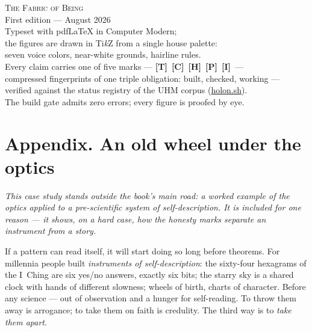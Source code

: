 \documentclass[11pt,letterpaper]{article}
\newcommand{\stT}{\textbf{[T]}\xspace}
\newcommand{\stC}{\textbf{[C]}\xspace}
\newcommand{\stP}{\textbf{[P]}\xspace}
\newcommand{\stI}{\textbf{[I]}\xspace}
\newcommand{\stH}{\textbf{[H]}\xspace}
\newcommand{\holonsh}{\href{https://holon.sh}{holon.sh}\xspace}
\newcommand{\voicerose}[4]{%
  \foreach \vang/\vcol in {90/cA,141.4/cS,192.8/cD,244.3/cL,295.7/cE,347.1/cO,38.6/cU}{%
    \draw[\vcol!55, thick] (#1,#2) -- ($(#1,#2)+(\vang:#3)$);
    \fill[\vcol] ($(#1,#2)+(\vang:#3)$) circle (#4);}}
\begin{document}
\clearpage
\thispagestyle{empty}
\vspace*{\fill}
\begin{center}\small\color{plosgray}
\begin{minipage}{0.78\textwidth}\centering
{\scshape The Fabric of Being}\\[3pt]
First edition --- August 2026\\[12pt]
Typeset with pdf\LaTeX{} in Computer Modern;\\
the figures are drawn in Ti\emph{k}Z from a single house palette:\\
seven voice colors, near-white grounds, hairline rules.\\[8pt]
Every claim carries one of five marks --- \stT\ \stC\ \stH\ \stP\ \stI\ ---\\
compressed fingerprints of one triple obligation: built, checked, working ---\\
verified against the status registry of the UHM corpus (\holonsh).\\
The build gate admits zero errors; every figure is proofed by eye.\\[14pt]
\end{minipage}
\end{center}
\vspace*{\fill}


\clearpage
\section*{Appendix. An old wheel under the optics}

\noindent\emph{This case study stands outside the book's main road:
a worked example of the optics applied to a pre-scientific system of
self-description. It is included for one reason --- it shows, on a
hard case, how the honesty marks separate an instrument from a
story.}\medskip


If a pattern can read itself, it will start doing so long before
theorems. For millennia people built \emph{instruments of
self-description}: the sixty-four hexagrams of the I~Ching are six
yes/no answers, exactly six bits; the starry sky is a shared clock
with hands of different slowness; wheels of birth, charts of
character. Before any science --- out of observation and a hunger
for self-reading. To throw them away is arrogance; to take them on
faith is credulity. The third way is to \emph{take them apart}.
\end{document}
